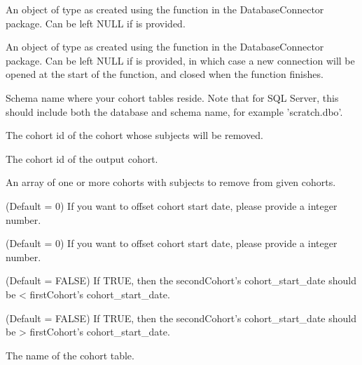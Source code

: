 \documentclass[a4paper]{book}
\begin{document}
\begin{Arguments}
\begin{ldescription}
\item[\code{connectionDetails}] An object of type  as created using the
 function in the
DatabaseConnector package. Can be left NULL if  is
provided.

\item[\code{connection}] An object of type  as created using the
 function in the
DatabaseConnector package. Can be left NULL if 
is provided, in which case a new connection will be opened at the start
of the function, and closed when the function finishes.

\item[\code{cohortDatabaseSchema}] Schema name where your cohort tables reside. Note that for SQL Server,
this should include both the database and schema name, for example
'scratch.dbo'.

\item[\code{cohortId}] The cohort id of the cohort whose subjects will be removed.

\item[\code{newCohortId}] The cohort id of the output cohort.

\item[\code{cohortsWithSubjectsToRemove}] An array of one or more cohorts with subjects to remove from given cohorts.

\item[\code{offsetCohortStartDate}] (Default = 0) If you want to offset cohort start date, please provide a integer number.

\item[\code{offsetCohortEndDate}] (Default = 0) If you want to offset cohort start date, please provide a integer number.

\item[\code{restrictSecondCohortStartBeforeFirstCohortStart}] (Default = FALSE) If TRUE, then the secondCohort's cohort\_start\_date
should be < firstCohort's cohort\_start\_date.

\item[\code{restrictSecondCohortStartAfterFirstCohortStart}] (Default = FALSE) If TRUE, then the secondCohort's cohort\_start\_date
should be > firstCohort's cohort\_start\_date.

\item[\code{cohortTable}] The name of the cohort table.


\end{ldescription}
\end{Arguments}
\end{document}
